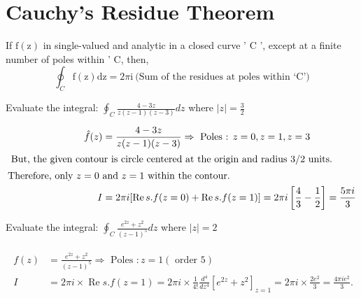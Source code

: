 \section{Cauchy's Residue Theorem }
If $\mathrm{f}(\mathrm{z})$ in single-valued and analytic in a closed curve ' $\mathrm{C}$ ', except at a finite number of poles within ' $\mathrm{C}$, then, 
\begin{equation}
\oint_{C} \mathrm{f}(\mathrm{z}) \mathrm{dz}=2 \pi \mathrm{i}\ \text{(Sum of the residues at poles within `$\mathrm{C}$')}
\end{equation}
\begin{exercise}
	Evaluate the integral: $\oint_{C} \frac{4-3 z}{z(z-1)(z-3)} d z$ where $|z|=\frac{3}{2}$
\end{exercise}
\begin{answer}
	\begin{align*}
	\hat{f}(z)&=\frac{4-3 z}{z(z-1)(z-3)} \Rightarrow\text{ Poles : }z=0, z=1, z=3\\
\intertext{	But, the given contour is circle centered at the origin and radius $3 / 2$ units.} 
\text{Therefore, only $z=0$ }&\text{and $z=1$ within the contour.}\\
	I&=2 \pi i[\operatorname{Re} s . f(z=0)+\operatorname{Re} s . f(z=1)]=2 \pi i\left[\frac{4}{3}-\frac{1}{2}\right]=\frac{5 \pi i}{3}
	\end{align*}
\end{answer}
\begin{exercise}
	Evaluate the integral: $\oint_{C} \frac{e^{2 z}+z^{2}}{(z-1)^{5}} d z$ where $|z|=2$
\end{exercise}
\begin{answer}
	\begin{align*}
	\begin{aligned}
	f(z)&=\frac{e^{2 z}+z^{2}}{(z-1)^{5}} \Rightarrow \text { Poles }: z=1(\text { order } 5) \\
	I&=2 \pi i \times \operatorname{Re} s . f(z=1)=2 \pi i \times \frac{1}{4 !} \frac{d^{4}}{d z^{4}}\left[e^{2 z}+z^{2}\right]_{z=1}=2 \pi i \times \frac{2 e^{2}}{3}=\frac{4 \pi i e^{2}}{3} .
	\end{aligned}
	\end{align*}
\end{answer}
